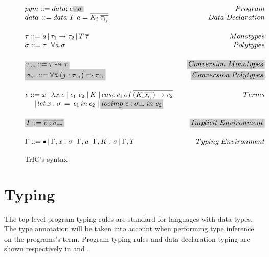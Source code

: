 \begin{figure}
   \[
\begin{array}{@{\hspace{0mm}}l@{\hspace{0mm}}}
  pgm ::= \overline{data};\term\highlight{:\typeS}\hfill Program\\
  data\,::= data\;T\;\tyVar=\overline{K_i\;\overline{\type_{i_j}}}\hfill Data\;Declaration
  \\[5mm]
  \type ::= \tyVar\,|\,\type_1\to\type_2\,|\,T\,\overline{\type}\hfill Monotypes\\
  \typeS ::= \type\,|\,\forall\tyVar.\typeS\hfill Polytypes
  \\[5mm]
    \highlight{\type_{\rightsquigarrow} ::= \type \rightsquigarrow \type}\hfill \highlight{Conversion\;Monotypes}\\
  \highlight{\typeS_{\rightsquigarrow} ::= \forall \overline {\tyVar} . \overline{(j : \type_{\rightsquigarrow})} \Rightarrow \type_{\rightsquigarrow}}\hfill \highlight{Conversion\;Polytypes}
  \\[5mm]
  \term ::= \tmVar\;|\,\lambda \tmVar.\term\;|\,\term_1 \; \term_2\;|\, K \;|\, case \, \term_1 \, of\, \overline{(K_i \overline{\tmVar_{i_j}}) \rightarrow \term_2} \hfill Terms\\
  \phantom{\term ::}|\, let \, \tmVar :\typeS\, =\, \term_1 \,in\, \term_2  \;|\,\highlight{ locimp \; \term : \typeS_{\rightsquigarrow}\; in\; \term_2}
  \\[5mm]
  \highlight{\imEnv::=\overline{\term : \typeS_{\rightsquigarrow}}} \hfill \highlight{Implicit\;Environment}
  \\[5mm]
  \tyEnv::=\bullet\,|\,\tyEnv,\tmVar:\typeS\,|\,\tyEnv,\tyVar\,|\,\tyEnv,K:\typeS\,|\,\tyEnv,T \hfill \phantom{xxxxxxxxxxxxxxx} Typing\; Environment

  \end{array}
\]
  \caption{TrIC's syntax}
  \label{mlsyntax}
\end{figure}

\section{Typing}
\label{5.2}
The top-level program typing rules are standard for languages with data types. The type annotation will be taken into account when performing type inference on the programs's term. Program typing rules and data declaration typing are shown respectively in  and .

